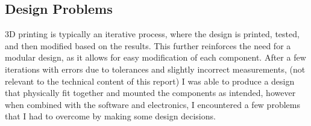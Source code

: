 \subsection{Design Problems}
3D printing is typically an iterative process, where the design is printed, tested, and then modified based on the results.
This further reinforces the need for a modular design, as it allows for easy modification of each component.
After a few iterations with errors due to tolerances and slightly incorrect measurements, (not relevant to the technical content of this report)
I was able to produce a design that physically fit together and mounted the components as intended, however when combined with the software
and electronics, I encountered a few problems that I had to overcome by making some design decisions.